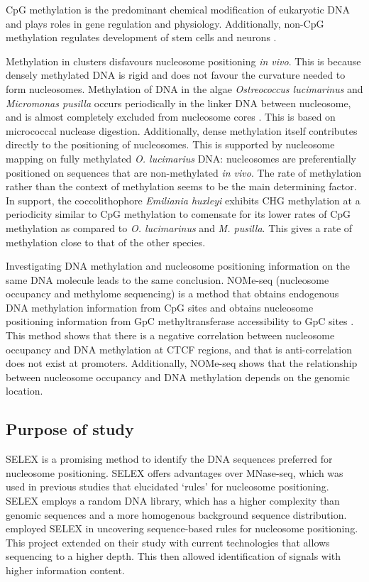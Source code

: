\documentclass[parskip=full, numbers=noenddot]{scrreprt}
\begin{document}
CpG methylation is the predominant chemical modification of eukaryotic DNA and plays roles in gene regulation and physiology.  Additionally, non-CpG methylation regulates development of stem cells and neurons \citep{guo_distribution_2014}.

Methylation in clusters disfavours nucleosome positioning \emph{in vivo}. This is because densely methylated DNA is rigid and does not favour the curvature needed to form nucleosomes.  Methylation of DNA in the algae \emph{Ostreococcus lucimarinus} and \emph{Micromonas pusilla} occurs periodically in the linker DNA between nucleosome, and is almost completely excluded from nucleosome cores \citep{huff_dnmt1-independent_2014}.  This is based on micrococcal nuclease digestion.  Additionally, dense methylation itself contributes directly to the positioning of nucleosomes.  This is supported by nucleosome mapping on fully methylated \emph{O. lucimarius} DNA: nucleosomes are preferentially positioned on sequences that are non-methylated \emph{in vivo}.
The rate of methylation rather than the context of methylation seems to be the main determining factor.  In support, the coccolithophore \emph{Emiliania huxleyi} exhibits CHG methylation at a periodicity similar to CpG methylation to comensate for its lower rates of CpG methylation as compared to \emph{O. lucimarinus} and \emph{M. pusilla}.  This gives a rate of methylation close to that of the other species.

Investigating DNA methylation and nucleosome positioning information on the same DNA molecule leads to the same conclusion.  NOMe-seq (nucleosome occupancy and methylome sequencing) is a method that obtains endogenous DNA methylation information from CpG sites and obtains nucleosome positioning information from GpC methyltransferase accessibility to GpC sites \citep{kelly_genome-wide_2012}.  This method shows that there is a negative correlation between nucleosome occupancy and DNA methylation at CTCF regions, and that is anti-correlation does not exist at promoters.  Additionally, NOMe-seq shows that the relationship between nucleosome occupancy and DNA methylation depends on the genomic location.

\subsection{Purpose of study}
\label{ssec:emsaselex_intro_why}

SELEX is a promising method to identify the DNA sequences preferred for nucleosome positioning.  SELEX offers advantages over MNase-seq, which was used in previous studies that elucidated `rules' for nucleosome positioning.  SELEX employs a random DNA library, which has a higher complexity than genomic sequences and a more homogenous background sequence distribution.  \citet{lowary_new_1998} employed SELEX in uncovering sequence-based rules for nucleosome positioning. This project extended on their study with current technologies that allows sequencing to a higher depth.  This then allowed identification of signals with higher information content.
\end{document}
